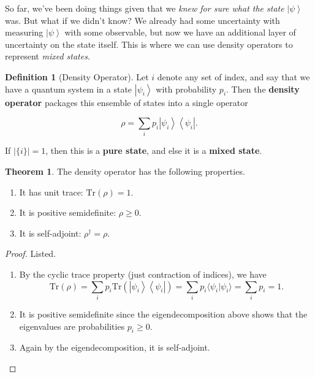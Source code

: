 \documentclass{article}
\newcommand{\ket}[1]{\ensuremath{\left|#1\right\rangle}}
\newcommand{\bra}[1]{\ensuremath{\left\langle#1\right|}}
\theoremstyle{definition}
\newtheorem{theorem}{Theorem}[section]
\newtheorem{definition}{Definition}[section]
\begin{document}
  So far, we've been doing things given that we \textit{knew for sure what the state } $\ket{\psi}$ was. But what if we didn't know? We already had some uncertainty with measuring $\ket{\psi}$ with some observable, but now we have an additional layer of uncertainty on the state itself. This is where we can use density operators to represent \textit{mixed states}. 

  \begin{definition}[Density Operator]
    Let $i$ denote any set of index, and say that we have a quantum system in a state $\ket{\psi_i}$ with probability $p_i$. Then the \textbf{density operator} packages this ensemble of states into a single operator

      \[\rho = \sum_i p_i \ket{\psi_i} \bra{\psi_i}.\]

    If $|\{i\}| = 1$, then this is a \textbf{pure state}, and else it is a \textbf{mixed state}. 
  \end{definition}

  \begin{theorem}
    The density operator has the following properties. 

    \begin{enumerate}
      \item It has unit trace: $\text{Tr}(\rho) = 1$.
      \item It is positive semidefinite: $\rho \geq 0$.
      \item It is self-adjoint: $\rho^\dagger = \rho$.
    \end{enumerate}
  \end{theorem}

  \begin{proof} 
    Listed. 
    \begin{enumerate} 
      \item By the cyclic trace property (just contraction of indices), we have 
        \begin{equation} 
          \text{Tr}(\rho) = \sum_i p_i \text{Tr}(\ket{\psi_i} \bra{\psi_i}) = \sum_i p_i \langle \psi_i | \psi_i \rangle = \sum_i p_i = 1.
        \end{equation}

      \item It is positive semidefinite since the eigendecomposition above shows that the eigenvalues are probabilities $p_i \geq 0$. 
      \item Again by the eigendecomposition, it is self-adjoint. 
    \end{enumerate}
  \end{proof}
\end{document}
